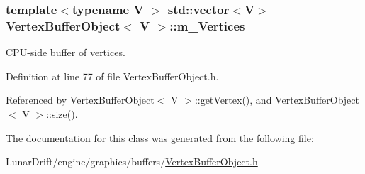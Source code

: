 \subsubsection[{\texorpdfstring{m\+\_\+\+Vertices}{m_Vertices}}]{\setlength{\rightskip}{0pt plus 5cm}template$<$typename V $>$ std\+::vector$<$V$>$ {\bf Vertex\+Buffer\+Object}$<$ V $>$\+::m\+\_\+\+Vertices\hspace{0.3cm}{\ttfamily [private]}}\hypertarget{class_vertex_buffer_object_aa8ccd2ec2c067c5fff5bb2dded70fcc6}{}\label{class_vertex_buffer_object_aa8ccd2ec2c067c5fff5bb2dded70fcc6}


C\+P\+U-\/side buffer of vertices. 



Definition at line 77 of file Vertex\+Buffer\+Object.\+h.



Referenced by Vertex\+Buffer\+Object$<$ V $>$\+::get\+Vertex(), and Vertex\+Buffer\+Object$<$ V $>$\+::size().



The documentation for this class was generated from the following file\+:\begin{DoxyCompactItemize}
\item 
Lunar\+Drift/engine/graphics/buffers/\hyperlink{_vertex_buffer_object_8h}{Vertex\+Buffer\+Object.\+h}\end{DoxyCompactItemize}
